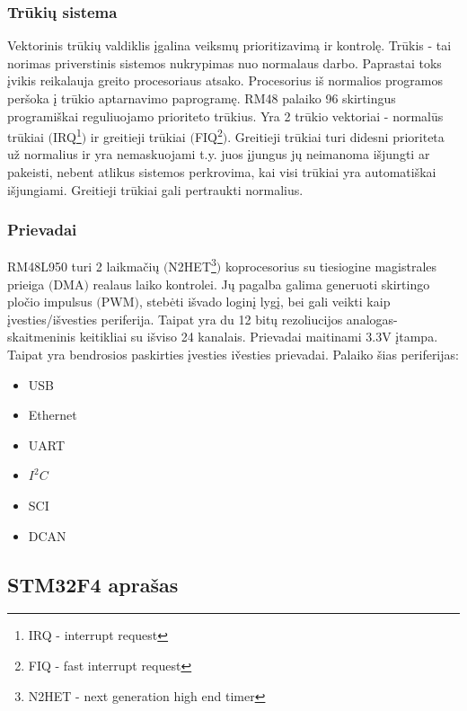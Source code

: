 \documentclass[a4paper, 12pt]{article} %
\begin{document}
\begin{onehalfspacing}
\subsubsection{Tr\=uki\k{u} sistema}
Vektorinis tr\=uki\k{u} valdiklis \k{i}galina veiksm\k{u} prioritizavim\k{a} ir kontrol\k{e}. Tr\=ukis - tai norimas priverstinis sistemos nukrypimas nuo normalaus darbo. Paprastai toks \k{i}vikis reikalauja greito procesoriaus atsako. Procesorius i\v{s} normalios programos per\v{s}oka \k{i} tr\=ukio aptarnavimo paprogram\k{e}. RM48 palaiko 96 skirtingus programi\v{s}kai reguliuojamo prioriteto tr\=ukius. Yra 2 tr\=ukio vektoriai - normal\=us tr\=ukiai $($IRQ\footnote{IRQ - interrupt request}$)$ ir greitieji tr\=ukiai $($FIQ\footnote{FIQ - fast interrupt request}$)$. Greitieji tr\=ukiai turi didesni prioriteta u\v{z} normalius ir yra nemaskuojami t.y. juos \k{i}jungus j\k{u} neimanoma i\v{s}jungti ar pakeisti, nebent atlikus sistemos perkrovima, kai visi tr\=ukiai yra automati\v{s}kai i\v{s}jungiami. Greitieji tr\=ukiai gali pertraukti normalius.  


\subsubsection{Prievadai}
RM48L950 turi 2 laikma\v{c}i\k{u} $($N2HET\footnote{N2HET - next generation high end timer}$)$ koprocesorius su tiesiogine magistrales prieiga $($DMA$)$ realaus laiko kontrolei. J\k{u} pagalba galima generuoti skirtingo plo\v{c}io impulsus $($PWM$)$, steb\.eti i\v{s}vado login\k{i} lyg\k{i}, bei gali veikti kaip \k{i}vesties/i\v{s}vesties periferija. Taipat yra du 12 bit\k{u} rezoliucijos analogas-skaitmeninis keitikliai su i\v{s}viso 24 kanalais. Prievadai maitinami 3.3V \k{i}tampa. Taipat yra bendrosios paskirties \k{i}vesties i\v{v}esties prievadai.
Palaiko \v{s}ias periferijas:
\begin{itemize}
\item USB
\item Ethernet
\item UART
\item $I^2C$
\item SCI
\item DCAN
\end{itemize}



\subsection{STM32F4 apra\v{s}as}



\end{onehalfspacing}
\end{document}
